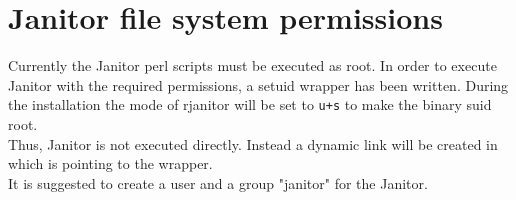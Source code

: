 \section{Janitor file system permissions}

Currently the Janitor perl scripts must be executed as root. In order to execute Janitor with the required permissions,
a setuid wrapper has been written. During the installation  the mode of rjanitor will be set to \texttt{u+s}
to make the binary suid root. \\

Thus, Janitor is not executed directly. Instead a dynamic link will be created in  which is pointing to
the wrapper.\\

It is suggested to create a user and a group "janitor" for the Janitor.\\

% 


